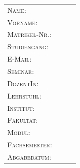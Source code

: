 \documentclass{Vorlage}
\begin{document}

\begin{titlepage}


\vspace*{6cm}


\vspace{1cm}

\begin{tabular}{p{3.5cm}|p{0.1cm} p{10cm}l}
\textsc{Name:} & & \textsc{}\\
\textsc{Vorname:} & & \textsc{}\\
\textsc{Matrikel-Nr.:} & & \textsc{}\\
\textsc{Studiengang:} & & \textsc{}\\
\textsc{E-Mail:} & & \textsc{}\\
\textsc{Seminar:} & & \textsc{}\\
\textsc{DozentIn:} & & \textsc{}\\
\textsc{Lehrstuhl:} & & \textsc{}\\
\textsc{Institut:} & & \textsc{}\\
\textsc{Fakult\"at:} & & \textsc{}\\
\textsc{Modul:} & & \textsc{}\\
\textsc{Fachsemester:} & & \textsc{}\\
\textsc{Abgabedatum:} & & \textsc{}\\
\end{tabular}
\end{titlepage}

\restoregeometry


\tableofcontents %

\newpage %

\listoffigures %

\listoftables %

\newpage


\renewcommand{\thesection}{\Roman{section}} %
\end{document}
